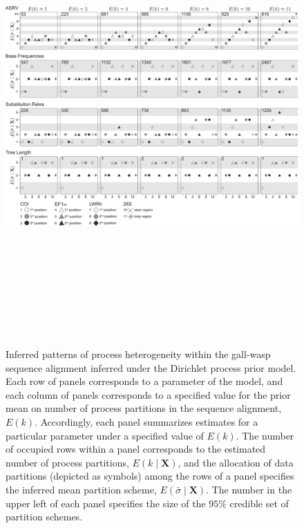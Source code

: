 \documentclass[11pt]{article}
\begin{document}
\begin{figure}[h] 
\centering 
\includegraphics[angle=90, height=175mm]{figures/figure_2.pdf} 
\caption{Inferred patterns of process heterogeneity within the gall-wasp sequence alignment inferred under the Dirichlet process prior model.  Each row of panels corresponds to a parameter of the model, and each column of panels corresponds to a specified value for the prior mean on number of process partitions in the sequence alignment, $E(k)$.  Accordingly, each panel summarizes estimates for a particular parameter under a specified value of $E(k)$.  The number of occupied rows within a panel corresponds to the estimated number of process partitions, $E(k \mid \mathbf{X})$, and the allocation of data partitions (depicted as symbols) among the rows of a panel specifies the inferred mean partition scheme, $E(\bar{\sigma} \mid \mathbf{X})$.  The number in the upper left of each panel specifies the size of the $95\%$ credible set of partition schemes.}
\label{gall_wasps}
\end{figure} 
\end{document}
